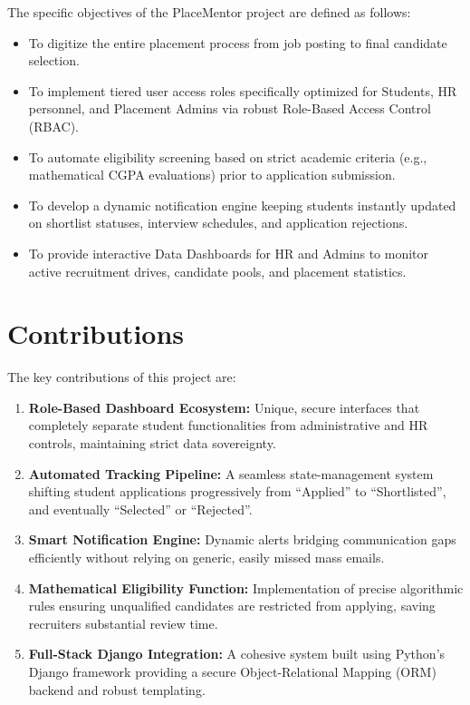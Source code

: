 \documentclass[a4paper,12pt]{report}
\begin{document}
The specific objectives of the PlaceMentor project are defined as follows:

\begin{itemize}
    \item To digitize the entire placement process from job posting to final candidate selection.
    \item To implement tiered user access roles specifically optimized for Students, HR personnel, and Placement Admins via robust Role-Based Access Control (RBAC).
    \item To automate eligibility screening based on strict academic criteria (e.g., mathematical CGPA evaluations) prior to application submission.
    \item To develop a dynamic notification engine keeping students instantly updated on shortlist statuses, interview schedules, and application rejections.
    \item To provide interactive Data Dashboards for HR and Admins to monitor active recruitment drives, candidate pools, and placement statistics.
\end{itemize}

\section{Contributions}

The key contributions of this project are:

\begin{enumerate}
    \item \textbf{Role-Based Dashboard Ecosystem:} Unique, secure interfaces that completely separate student functionalities from administrative and HR controls, maintaining strict data sovereignty.
    \item \textbf{Automated Tracking Pipeline:} A seamless state-management system shifting student applications progressively from ``Applied'' to ``Shortlisted'', and eventually ``Selected'' or ``Rejected''.
    \item \textbf{Smart Notification Engine:} Dynamic alerts bridging communication gaps efficiently without relying on generic, easily missed mass emails.
    \item \textbf{Mathematical Eligibility Function:} Implementation of precise algorithmic rules ensuring unqualified candidates are restricted from applying, saving recruiters substantial review time.
    \item \textbf{Full-Stack Django Integration:} A cohesive system built using Python's Django framework providing a secure Object-Relational Mapping (ORM) backend and robust templating.
\end{enumerate}
\end{document}
